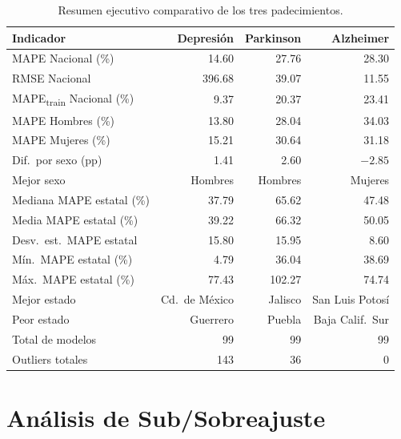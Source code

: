 \documentclass[11pt,a4paper]{article}
\begin{document}
\begin{table}[H]
\centering
\caption{Resumen ejecutivo comparativo de los tres padecimientos.}
\label{tab:resumen-ejecutivo}
\small
\begin{tabular}{@{}l r r r@{}}
\toprule
\textbf{Indicador} & \textbf{Depresión} & \textbf{Parkinson} & \textbf{Alzheimer} \\
\midrule
MAPE Nacional (\%)            & 14.60  & 27.76  & 28.30 \\
RMSE Nacional                 & 396.68 & 39.07  & 11.55 \\
MAPE\textsubscript{train} Nacional (\%) & 9.37 & 20.37 & 23.41 \\
\addlinespace
MAPE Hombres (\%)             & 13.80  & 28.04  & 34.03 \\
MAPE Mujeres (\%)             & 15.21  & 30.64  & 31.18 \\
Dif.\ por sexo (pp)           & 1.41   & 2.60   & $-2.85$ \\
Mejor sexo                    & Hombres & Hombres & Mujeres \\
\addlinespace
Mediana MAPE estatal (\%)     & 37.79  & 65.62  & 47.48 \\
Media MAPE estatal (\%)       & 39.22  & 66.32  & 50.05 \\
Desv.\ est.\ MAPE estatal    & 15.80  & 15.95  & 8.60 \\
Mín.\ MAPE estatal (\%)      & 4.79   & 36.04  & 38.69 \\
Máx.\ MAPE estatal (\%)      & 77.43  & 102.27 & 74.74 \\
\addlinespace
Mejor estado                  & Cd.\ de México & Jalisco & San Luis Potosí \\
Peor estado                   & Guerrero & Puebla & Baja Calif.\ Sur \\
\addlinespace
Total de modelos              & 99     & 99     & 99 \\
Outliers totales              & 143    & 36     & 0 \\
\bottomrule
\end{tabular}
\end{table}

\section{Análisis de Sub/Sobreajuste}\label{sec:subsobreajuste}
\end{document}
